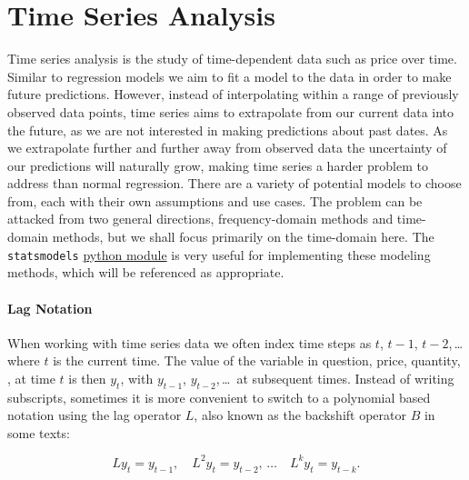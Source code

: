 \chapter{Time Series Analysis}
\label{chap:time_series}

Time series analysis is the study of time-dependent data such as price over time.
Similar to regression models we aim to fit a model
to the data in order to make future predictions.
However, instead of interpolating within a range of previously observed data points,
time series aims to extrapolate from our current data into the future,
as we are not interested in making predictions about past dates.
As we extrapolate further and further away from observed data
the uncertainty of our predictions will naturally grow,
making time series a harder problem to address than normal regression.
There are a variety of potential models to choose from,
each with their own assumptions and use cases.
The problem can be attacked from two general directions,
frequency-domain methods and time-domain methods,
but we shall focus primarily on the time-domain here.
The \texttt{statsmodels} \href{https://www.statsmodels.org}{python module}
is very useful for implementing these modeling methods,
which will be referenced as appropriate.

\subsubsection{Lag Notation}
\label{time_series:L}

When working with time series data we often index time steps as $t$, $t-1$, $t-2$,\,\ldots\,
where $t$ is the current time.
The value of the variable in question, price, quantity, \etc,
at time $t$ is then $y_{t}$, with $y_{t-1}$, $y_{t-2}$,\,\ldots\, at subsequent times.
Instead of writing subscripts, sometimes it is more convenient
to switch to a polynomial based notation using
the lag operator $L$, also known as the backshift operator $B$ in some texts:

\begin{equation}\label{eq:time_series:L}
L y_{t} = y_{t-1},\quad L^{2} y_{t} = y_{t-2},\,\ldots \quad L^{k} y_{t} = y_{t-k}.
\end{equation}

